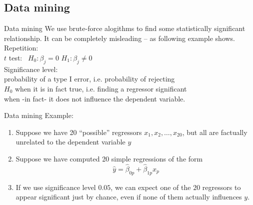 \documentclass[usenames,dvipsnames]{beamer}
\begin{document}
\subsection{Data mining}
\begin{frame}{Data mining}
We use brute-force alogithms to find some statistically significant relationship. It can be completely misleading – as following example shows. \\
\bigskip
Repetition:  \\
\medskip
\qquad $t$ test: \ $H_0: \beta_j = 0$ \quad $H_1 : \beta_j \neq 0$ \\
\medskip
\qquad Significance level: \\
\qquad probability of a type I error, i.e. probability of rejecting \\ 
\qquad $H_0$ when it  is in fact true, i.e. finding a regressor significant \\ 
\qquad when -in fact- it does not influence the dependent variable.
\end{frame}
\begin{frame}{Data mining}
Example: 
\vspace{0.3cm}
\begin{enumerate}
\item Suppose we have 20 ``possible'' regressors $x_1, x_2, \dots, x_{20}$, but all are  factually unrelated to the dependent variable $y$
\vspace{0.3cm}
\item Suppose we have computed 20 simple regressions of the form
$$\hat{y} = \hat{\beta}_{0p} + \hat{\beta}_{1p} x_p$$

\vspace{0.3cm}
\item If we use significance level $0.05$, we can expect one of the $20$ regressors to appear significant just by chance, even if none of them actually influences $y$.
\end{enumerate}
\end{frame}
\end{document}
